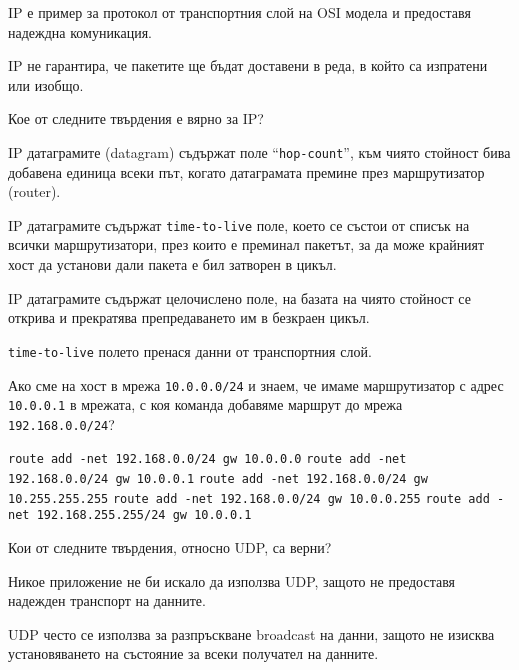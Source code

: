 \begin{questions}
\begin{choices}
    \choice IP е пример за протокол от транспортния слой на OSI модела и
    предоставя надеждна комуникация.

    \CorrectChoice IP не гарантира, че пакетите ще бъдат доставени в реда, в
    който са изпратени или изобщо.
  \end{choices}

  \question[6] Кое от следните твърдения е вярно за IP?
  \begin{choices}
    \choice IP датаграмите (\foreignlanguage{english}{datagram}) съдържат поле
    "`\texttt{\foreignlanguage{english}{hop-count}}"', към чиято стойност бива
    добавена единица всеки път, когато датаграмата премине през маршрутизатор
    (\foreignlanguage{english}{router}).

    \choice IP датаграмите съдържат
    \texttt{\foreignlanguage{english}{time-to-live}} поле, което се състои от
    списък на всички маршрутизатори, през които е преминал пакетът, за да може
    крайният хост да установи дали пакета е бил затворен в цикъл.

    \CorrectChoice IP датаграмите съдържат целочислено поле, на базата на чиято
    стойност се открива и прекратява препредаването им в безкраен цикъл.

    \choice \texttt{\foreignlanguage{english}{time-to-live}} полето пренася
    данни от транспортния слой.
  \end{choices}
  \question[6] Ако сме на хост в мрежа \texttt{10.0.0.0/24} и знаем, че имаме
  маршрутизатор с адрес \texttt{10.0.0.1} в мрежата, с коя команда добавяме
  маршрут до мрежа \texttt{192.168.0.0/24}?
  \begin{choices}
    \choice \texttt{route add -net 192.168.0.0/24 gw 10.0.0.0}
    \CorrectChoice \texttt{route add -net 192.168.0.0/24 gw 10.0.0.1}
    \choice \texttt{route add -net 192.168.0.0/24 gw 10.255.255.255}
    \choice \texttt{route add -net 192.168.0.0/24 gw 10.0.0.255}
    \choice \texttt{route add -net 192.168.255.255/24 gw 10.0.0.1}
  \end{choices}


  \question[7] Кои от следните твърдения, относно UDP, са верни?
  \begin{choices}
    \choice Никое приложение не би искало да използва UDP, защото не предоставя
    надежден транспорт на данните.

    \CorrectChoice UDP често се използва за разпръскване
    \foreignlanguage{english}{broadcast} на данни, защото не изисква
    установяването на състояние за всеки получател на данните.


\end{choices}
\end{questions}
